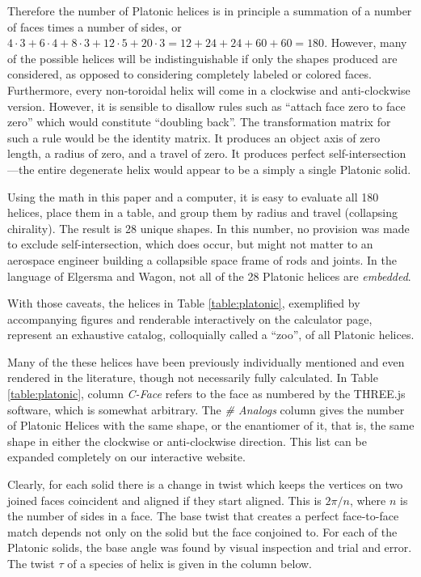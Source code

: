 \documentclass[11pt]{article}
\begin{document}
{Therefore the number of Platonic helices is in principle a summation of a number of faces times a number of sides, or
$4 \cdot 3 + 6 \cdot 4 + 8 \cdot 3 + 12 \cdot 5 + 20 \cdot 3 = 12 + 24 + 24 + 60 + 60 = 180$.
However, many of the possible helices will be indistinguishable if only the shapes produced are considered,
as opposed to considering completely labeled or colored faces.
Furthermore, every non-toroidal helix will come in a clockwise and anti-clockwise version.
However, it is sensible to disallow rules such as ``attach face zero to face zero''
which would constitute
``doubling back''\cite{elgersma2016quadrahelix}.
The transformation matrix for such a rule would be the identity matrix.
It produces an object axis of zero length, a radius of zero, and
a travel of zero. It produces perfect self-intersection---the entire
degenerate helix would appear to be a simply a single Platonic solid.

Using the math in this paper and a computer, it is easy to evaluate all 180 helices,
place them in a table, and group them
by radius and travel (collapsing chirality).
The result is 28 unique shapes. In this number, no provision was made to exclude
self-intersection,
which does occur, but might not matter to
an aerospace engineer building a collapsible space frame of rods and joints.
In the language of Elgersma and Wagon\cite{elgersma2016quadrahelix}, not
all of the 28 Platonic helices are {\em embedded}.

With those caveats, the helices in Table \ref{table:platonic}, exemplified by
accompanying figures and renderable
interactively on the calculator page, represent an exhaustive catalog,
colloquially called a ``zoo'', of all Platonic helices.

Many of the these helices have been previously individually
mentioned and even rendered in the literature,
though not necessarily fully calculated.
In Table \ref{table:platonic}, column {\em C-Face} refers to the
face as numbered by the THREE.js software\cite{dirksen2013learning},
which is somewhat arbitrary. The {\em \# Analogs}
column gives the number of Platonic Helices with the same shape, or the enantiomer of it,
that is, the same
shape in either the clockwise or anti-clockwise direction.
This list can be expanded completely on our interactive website.

Clearly, for each solid there is a change in twist which keeps the vertices on
two joined faces coincident and
aligned if they start aligned. This is $2\pi/n$,
where $n$ is the number of sides in a face. The base twist that creates
a perfect face-to-face match depends not only on the solid but the face conjoined to.
For each of the Platonic
solids, the base angle was found by visual inspection and trial and error.
The twist $\tau$ of a species
of helix is given in the column below.

}
\end{document}
